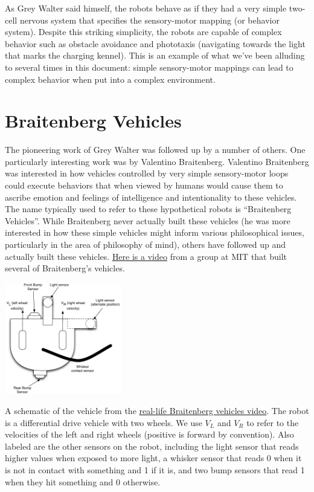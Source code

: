 \documentclass{tufte-handout}
\begin{document}
As Grey Walter said himself, the robots behave as if they had a very simple two-cell nervous system that specifies the sensory-motor mapping (or behavior system).  Despite this striking simplicity, the robots are capable of complex behavior such as obstacle avoidance and phototaxis (navigating towards the light that marks the charging kennel).  This is an example of what we've been alluding to several times in this document: simple sensory-motor mappings can lead to complex behavior when put into a complex environment.

\section{Braitenberg Vehicles}
The pioneering work of Grey Walter was followed up by a number of others.  One particularly interesting work was by Valentino Braitenberg. Valentino Braitenberg was interested in how vehicles controlled by very simple sensory-motor loops could execute behaviors that when viewed by humans would cause them to ascribe emotion and feelings of intelligence and intentionality to these vehicles. The name typically used to refer to these hypothetical robots is ``Braitenberg Vehicles''.  While Braitenberg never actually built these vehicles (he was more interested in how these simple vehicles might inform various philosophical issues, particularly in the area of philosophy of mind), others have followed up and actually built these vehicles.  \href{https://www.youtube.com/watch?v=VWeRC6j0fW4}{Here is a video} from a group at MIT that built several of Braitenberg's vehicles.

\begin{marginfigure}
\begin{center}
\includegraphics[width=2in]{Figures/robotschematic}
\end{center}
\caption{A schematic of the vehicle from the \href{https://www.youtube.com/watch?v=VWeRC6j0fW4}{real-life Braitenberg vehicles video}.  The robot is a differential drive vehicle with two wheels.  We use $V_L$ and $V_R$ to refer to the velocities of the left and right wheels (positive is forward by convention).  Also labeled are the other sensors on the robot, including the light sensor that reads higher values when exposed to more light, a whisker sensor that reads 0 when it is not in contact with something and 1 if it is, and two bump sensors that read 1 when they hit something and 0 otherwise.\label{fig:braitenbergschematic}}
\end{marginfigure}
\end{document}
